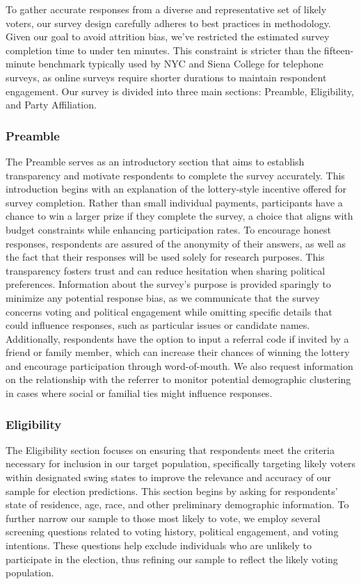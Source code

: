\documentclass[
  letterpaper,
  DIV=11,
  numbers=noendperiod]{scrartcl}
\begin{document}
To gather accurate responses from a diverse and representative set of
likely voters, our survey design carefully adheres to best practices in
methodology. Given our goal to avoid attrition bias, we've restricted
the estimated survey completion time to under ten minutes. This
constraint is stricter than the fifteen-minute benchmark typically used
by NYC and Siena College for telephone surveys, as online surveys
require shorter durations to maintain respondent engagement. Our survey
is divided into three main sections: Preamble, Eligibility, and Party
Affiliation.

\hypertarget{preamble}{%
\subsubsection{Preamble}\label{preamble}}

The Preamble serves as an introductory section that aims to establish
transparency and motivate respondents to complete the survey accurately.
This introduction begins with an explanation of the lottery-style
incentive offered for survey completion. Rather than small individual
payments, participants have a chance to win a larger prize if they
complete the survey, a choice that aligns with budget constraints while
enhancing participation rates. To encourage honest responses,
respondents are assured of the anonymity of their answers, as well as
the fact that their responses will be used solely for research purposes.
This transparency fosters trust and can reduce hesitation when sharing
political preferences. Information about the survey's purpose is
provided sparingly to minimize any potential response bias, as we
communicate that the survey concerns voting and political engagement
while omitting specific details that could influence responses, such as
particular issues or candidate names. Additionally, respondents have the
option to input a referral code if invited by a friend or family member,
which can increase their chances of winning the lottery and encourage
participation through word-of-mouth. We also request information on the
relationship with the referrer to monitor potential demographic
clustering in cases where social or familial ties might influence
responses.

\hypertarget{eligibility}{%
\subsubsection{Eligibility}\label{eligibility}}

The Eligibility section focuses on ensuring that respondents meet the
criteria necessary for inclusion in our target population, specifically
targeting likely voters within designated swing states to improve the
relevance and accuracy of our sample for election predictions. This
section begins by asking for respondents' state of residence, age, race,
and other preliminary demographic information. To further narrow our
sample to those most likely to vote, we employ several screening
questions related to voting history, political engagement, and voting
intentions. These questions help exclude individuals who are unlikely to
participate in the election, thus refining our sample to reflect the
likely voting population.
\end{document}
